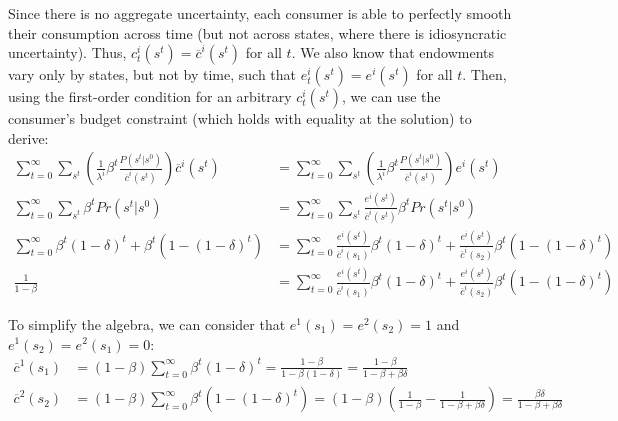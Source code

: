 \documentclass{article}
\begin{document}
\begin{enumerate}[(a)]
		Since there is no aggregate uncertainty, each consumer is able to perfectly smooth their consumption across time (but not across states, where there is idiosyncratic uncertainty). Thus, ${c^i_t(s^t)=\overline{c}^i(s^t)}$ for all $t$. We also know that endowments vary only by states, but not by time, such that ${e_t^i(s^t) = e^i(s^t)}$ for all $t$. Then, using the first-order condition for an arbitrary ${c_t^i(s^t)}$, we can use the consumer's budget constraint (which holds with equality at the solution) to derive:
		\begin{align*}
			\sum_{t=0}^\infty\sum_{s^t} \left(\frac{1}{\lambda^i}\beta^t\frac{P(s^t|s^0)}{\overline{c}^i(s^t)}\right)\overline{c}^i(s^t)
				&= \sum_{t=0}^\infty\sum_{s^t} \left(\frac{1}{\lambda^i}\beta^t\frac{P(s^t|s^0)}{\overline{c}^i(s^t)}\right)e^i(s^t)	\\
			\sum_{t=0}^\infty\sum_{s^t}\beta^tPr(s^t|s^0) &= \sum_{t=0}^\infty\sum_{s^t}\frac{e^i(s^t)}{\overline{c}^i(s^t)}\beta^tPr(s^t|s^0)	\\
			\sum_{t=0}^\infty\beta^t(1-\delta)^t + \beta^t(1-(1-\delta)^t)  &= 
			\sum_{t=0}^\infty\frac{e^i(s^t)}{\overline{c}^i(s_1)}\beta^t(1-\delta)^t	+ \frac{e^i(s^t)}{\overline{c}^i(s_2)}\beta^t(1-(1-\delta)^t) \\
			\frac{1}{1-\beta}	&= \sum_{t=0}^\infty\frac{e^i(s^t)}{\overline{c}^i(s_1)}\beta^t(1-\delta)^t	+ \frac{e^i(s^t)}{\overline{c}^i(s_2)}\beta^t(1-(1-\delta)^t)	
		\end{align*}
		
		To simplify the algebra, we can consider that ${e^1(s_1)=e^2(s_2)=1}$ and ${e^1(s_2)=e^2(s_1)=0}$:
		\begin{align*}
			\overline{c}^1(s_1) &= \left(1-\beta\right)\sum_{t=0}^\infty\beta^t(1-\delta)^t	 = \frac{1-\beta}{1-\beta(1-\delta)} = \frac{1-\beta}{1-\beta+\beta\delta}	\\
			\overline{c}^2(s_2) &= \left(1-\beta\right)\sum_{t=0}^\infty\beta^t(1-(1-\delta)^t)	= \left(1-\beta\right)\left(\frac{1}{1-\beta} - \frac{1}{1-\beta+\beta\delta}\right) = \frac{\beta\delta}{1-\beta+\beta\delta}
		\end{align*}
		

\end{enumerate}
\end{document}
